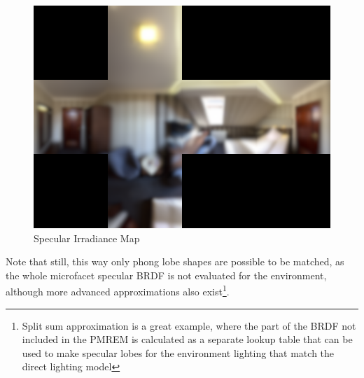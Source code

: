 \begin{figure}[ht]
    \centering
    \includegraphics[scale=0.36,clip=true]{./image/envl_rad.png}
    \caption{Specular Irradiance Map}
\label{fig:envlrad}
\end{figure}

Note that still, this way only phong lobe shapes are possible to be matched, as the whole microfacet specular
BRDF is not evaluated for the environment, although more advanced approximations also exist\footnote{Split sum approximation is a great
example, where the part of the BRDF not included in the PMREM is calculated as a separate lookup table that can be used to make
specular lobes for the environment lighting that match the direct lighting model}.
